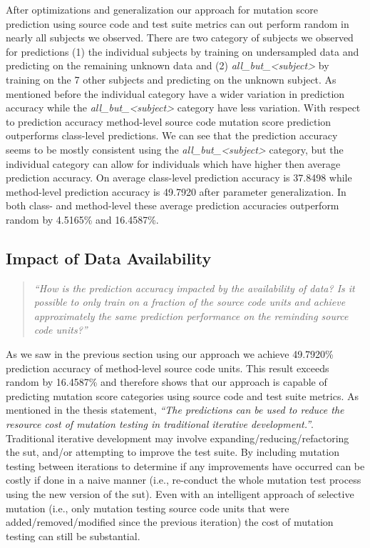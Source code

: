 After optimizations and generalization our approach for mutation score prediction using source code and test suite metrics can out perform random in nearly all subjects we observed. There are two category of subjects we observed for predictions (1) the individual subjects by training on undersampled data and predicting on the remaining unknown data and (2) \emph{all\_but\_<subject>} by training on the 7 other subjects and predicting on the unknown subject. As mentioned before the individual category have a wider variation in prediction accuracy while the \emph{all\_but\_<subject>} category have less variation. With respect to prediction accuracy method-level source code mutation score prediction outperforms class-level predictions. We can see that the prediction accuracy seems to be mostly consistent using the \emph{all\_but\_<subject>} category, but the individual category can allow for individuals which have higher then average prediction accuracy. On average class-level prediction accuracy is 37.8498 while method-level prediction accuracy is 49.7920 after parameter generalization. In both class- and method-level these average prediction accuracies outperform random by 4.5165\% and 16.4587\%.


\subsection{Impact of Data Availability}
\label{subsec:experiment_data}
\begin{quote}
	\emph{``How is the prediction accuracy impacted by the availability of data? Is it possible to only train on a fraction of the source code units and achieve approximately the same prediction performance on the reminding source code units?''}
\end{quote}

\noindent
As we saw in the previous section using our approach we achieve 49.7920\% prediction accuracy of method-level source code units. This result exceeds random by 16.4587\% and therefore shows that our approach is capable of predicting mutation score categories using source code and test suite metrics. As mentioned in the thesis statement, \emph{``The predictions can be used to reduce the resource cost of mutation testing in traditional iterative development.''}. Traditional iterative development may involve expanding/reducing/refactoring the \gls{sut}, and/or attempting to improve the test suite. By including mutation testing between iterations to determine if any improvements have occurred can be costly if done in a naive manner (i.e., re-conduct the whole mutation test process using the new version of the \gls{sut}). Even with an intelligent approach of selective mutation (i.e., only mutation testing source code units that were added/removed/modified since the previous iteration) the cost of mutation testing can still be substantial.


